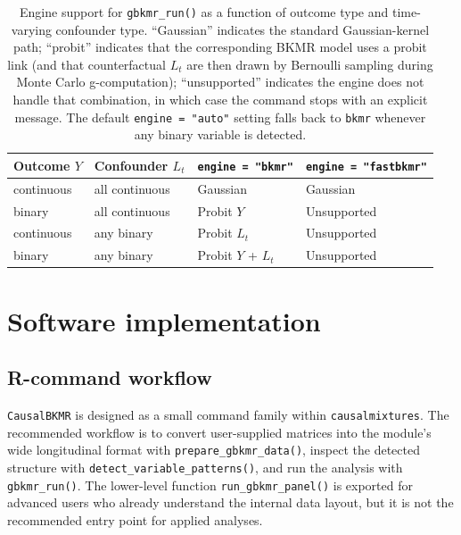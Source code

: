 \documentclass[11pt]{article}
\newcommand{\pkg}[1]{\texttt{#1}}
\newcommand{\code}[1]{\texttt{#1}}
\begin{document}
\begin{table}[h]
\centering
\setlength{\tabcolsep}{6pt}
\caption{Engine support for \code{gbkmr\_run()} as a function of outcome type and time-varying confounder type. ``Gaussian'' indicates the standard Gaussian-kernel path; ``probit'' indicates that the corresponding BKMR model uses a probit link (and that counterfactual $L_t$ are then drawn by Bernoulli sampling during Monte Carlo g-computation); ``unsupported'' indicates the engine does not handle that combination, in which case the command stops with an explicit message. The default \code{engine = "auto"} setting falls back to \pkg{bkmr} whenever any binary variable is detected.}
\label{tab:engine_support}
\begin{tabular}{llll}
\toprule
Outcome $Y$ & Confounder $L_t$ & \code{engine = "bkmr"} & \code{engine = "fastbkmr"} \\
\midrule
continuous & all continuous & Gaussian              & Gaussian     \\
binary     & all continuous & Probit $Y$            & Unsupported  \\
continuous & any binary     & Probit $L_t$          & Unsupported  \\
binary     & any binary     & Probit $Y$ + $L_t$    & Unsupported  \\
\bottomrule
\end{tabular}
\end{table}

\section*{Software implementation}
\label{sec:software}

\subsection*{R-command workflow}
\pkg{CausalBKMR} is designed as a small command family within \pkg{causalmixtures}. The recommended workflow is to convert user-supplied matrices into the module's wide longitudinal format with \code{prepare\_gbkmr\_data()}, inspect the detected structure with \code{detect\_variable\_patterns()}, and run the analysis with \code{gbkmr\_run()}. The lower-level function \code{run\_gbkmr\_panel()} is exported for advanced users who already understand the internal data layout, but it is not the recommended entry point for applied analyses.
\end{document}
